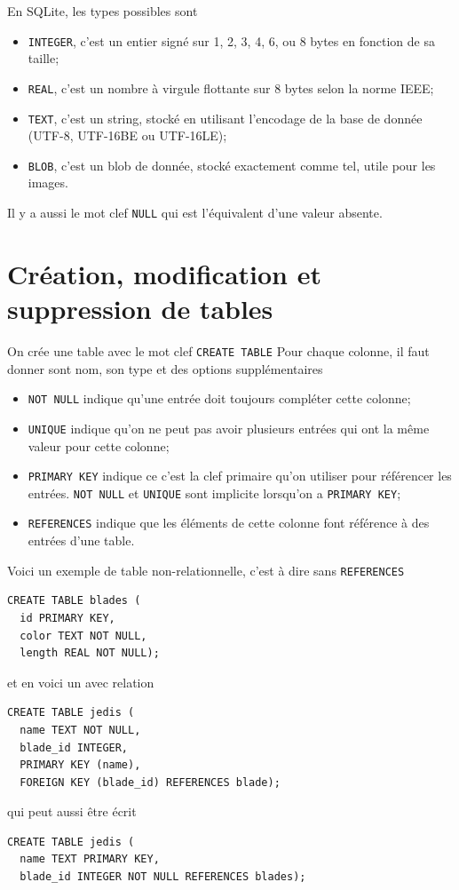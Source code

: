 En SQLite, les types possibles sont

\begin{itemize}
  \item \lstinline|INTEGER|, c'est un entier signé sur 1, 2, 3, 4, 6, ou 8 bytes
    en fonction de sa taille;
  \item \lstinline|REAL|, c'est un nombre à virgule flottante sur 8 bytes
    selon la norme IEEE;
  \item \lstinline|TEXT|, c'est un string, stocké en utilisant
    l'encodage de la base de donnée (UTF-8, UTF-16BE ou UTF-16LE);
  \item \lstinline|BLOB|, c'est un blob de donnée,
    stocké exactement comme tel, utile pour les images.
\end{itemize}
Il y a aussi le mot clef \lstinline|NULL| qui est l'équivalent
d'une valeur absente.

\section{Création, modification et suppression de tables}
On crée une table avec le mot clef \lstinline|CREATE TABLE|
Pour chaque colonne, il faut donner sont nom, son type
et des options supplémentaires
\begin{itemize}
  \item \lstinline|NOT NULL| indique qu'une entrée doit toujours compléter
    cette colonne;
  \item \lstinline|UNIQUE| indique qu'on ne peut pas avoir plusieurs
    entrées qui ont la même valeur pour cette colonne;
  \item \lstinline|PRIMARY KEY| indique ce c'est la clef primaire qu'on
    utiliser pour référencer les entrées.
    \lstinline|NOT NULL| et \lstinline|UNIQUE| sont implicite lorsqu'on a
    \lstinline|PRIMARY KEY|;
  \item \lstinline|REFERENCES| indique que les éléments de cette colonne
    font référence à des entrées d'une table.
\end{itemize}

Voici un exemple de table non-relationnelle, c'est à dire sans
\lstinline|REFERENCES|
\begin{lstlisting}
CREATE TABLE blades (
  id PRIMARY KEY,
  color TEXT NOT NULL,
  length REAL NOT NULL);
\end{lstlisting}
et en voici un avec relation
\begin{lstlisting}
CREATE TABLE jedis (
  name TEXT NOT NULL,
  blade_id INTEGER,
  PRIMARY KEY (name),
  FOREIGN KEY (blade_id) REFERENCES blade);
\end{lstlisting}
qui peut aussi être écrit
\begin{lstlisting}
CREATE TABLE jedis (
  name TEXT PRIMARY KEY,
  blade_id INTEGER NOT NULL REFERENCES blades);
\end{lstlisting}

